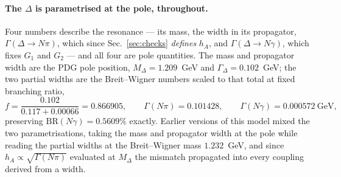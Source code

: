 \documentclass[11pt,a4paper]{article}
\begin{document}
\paragraph{The $\Delta$ is parametrised at the pole, throughout.}
\label{par:pole}
Four numbers describe the resonance --- its mass, the width in its propagator,
$\Gamma(\Delta\to N\pi)$, which since Sec.~\ref{sec:checks} \emph{defines}
$h_A$, and $\Gamma(\Delta\to N\gamma)$, which fixes $G_1$ and $G_2$ --- and all
four are pole quantities. The mass and propagator width are the PDG pole
position, $M_\Delta = 1.209$~GeV and $\Gamma_\Delta = 0.102$~GeV; the two
partial widths are the Breit--Wigner numbers scaled to that total at fixed
branching ratio,
\begin{equation}
  f = \frac{0.102}{0.117 + 0.00066} = 0.866905,
  \qquad
  \Gamma(N\pi) = 0.101428,
  \qquad
  \Gamma(N\gamma) = 0.000572\ \mathrm{GeV},
  \label{eq:polewidths}
\end{equation}
preserving $\mathrm{BR}(N\gamma) = 0.5609\%$ exactly. Earlier versions of this
model mixed the two parametrisations, taking the mass and propagator width at
the pole while reading the partial widths at the Breit--Wigner mass $1.232$~GeV,
and since $h_A \propto \sqrt{\Gamma(N\pi)}$ evaluated at $M_\Delta$ the mismatch
propagated into every coupling derived from a width.
\end{document}
